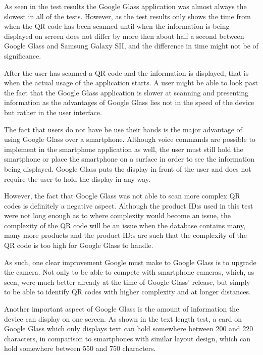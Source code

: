As seen in the test results the Google Glass application was almost always the slowest in all of the tests. However, as the test results only shows the time from when the QR code has been scanned until when the information is being displayed on screen does not differ by more then about half a second between Google Glass and Samsung Galaxy SII, and the difference in time might not be of significance. 

After the user has scanned a QR code and the information is displayed, that is when the actual usage of the application starts. A user might be able to look past the fact that the Google Glass application is slower at scanning and presenting information as the advantages of Google Glass lies not in the speed of the device but rather in the user interface.

The fact that users do not have be use their hands is the major advantage of using Google Glass over a smartphone. Although voice commands are possible to implement in the smartphone application as well, the user must still hold the smartphone or place the smartphone on a surface in order to see the information being displayed. Google Glass puts the display in front of the user and does not require the user to hold the display in any way.

However, the fact that Google Glass was not able to scan more complex QR codes is definitely a negative aspect. Although the product ID:s used in this test were not long enough as to where complexity would become an issue, the complexity of the QR code will be an issue when the database contains many, many more products and the product ID:s are such that the complexity of the QR code is too high for Google Glass to handle.

As such, one clear improvement Google must make to Google Glass is to upgrade the camera. Not only to be able to compete with smartphone cameras, which, as seen, were much better already at the time of Google Glass' release, but simply to be able to identify QR codes with higher complexity and at longer distances.

Another important aspect of Google Glass is the amount of information the device can display on one screen. As shown in the text length test, a card on Google Glass which only displays text can hold somewhere between 200 and 220 characters, in comparison to smartphones with similar layout design, which can hold somewhere between 550 and 750 characters.

